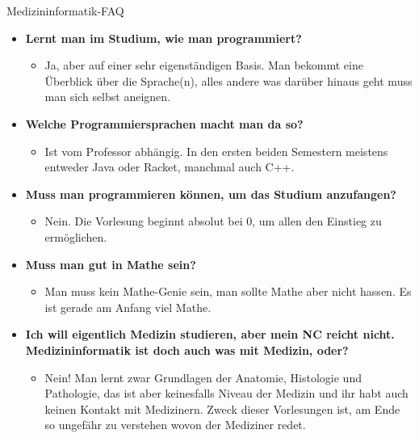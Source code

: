\begin{LARGE}
	Medizininformatik-FAQ
\end{LARGE}
\begin{large}
\begin{itemize}
	\item \textbf{Lernt man im Studium, wie man programmiert?}
	\begin{itemize}
		\item Ja, aber auf einer sehr eigenständigen Basis. Man bekommt eine Überblick über die Sprache(n), alles andere was darüber hinaus geht muss man sich selbst aneignen.
	\end{itemize}
\end{itemize}
	
\begin{itemize}
	\item \textbf{Welche Programmiersprachen macht man da so?}
	\begin{itemize}
		\item Ist vom Professor abhängig. In den ersten beiden Semestern meistens entweder Java oder Racket, manchmal auch C++.
	\end{itemize}
\end{itemize}

\begin{itemize}
	\item \textbf{Muss man programmieren können, um das Studium anzufangen?}
	\begin{itemize}
		\item Nein. Die Vorlesung beginnt absolut bei 0, um allen den Einstieg zu ermöglichen.
	\end{itemize}
\end{itemize}

\begin{itemize}
	\item \textbf{Muss man gut in Mathe sein?}
	\begin{itemize}
		\item Man muss kein Mathe-Genie sein, man sollte Mathe aber nicht hassen. Es ist gerade am Anfang viel Mathe.
	\end{itemize}
\end{itemize}

\begin{itemize}
	\item \textbf{Ich will eigentlich Medizin studieren, aber mein NC reicht nicht. Medizininformatik ist doch auch was mit Medizin, oder?}
	\begin{itemize}
		\item Nein! Man lernt zwar Grundlagen der Anatomie, Histologie und Pathologie, das ist aber keinesfalls Niveau der Medizin und ihr habt auch keinen Kontakt mit Medizinern. Zweck dieser Vorlesungen ist, am Ende so ungefähr zu verstehen wovon der Mediziner redet.
	\end{itemize}
\end{itemize}


\end{large}
